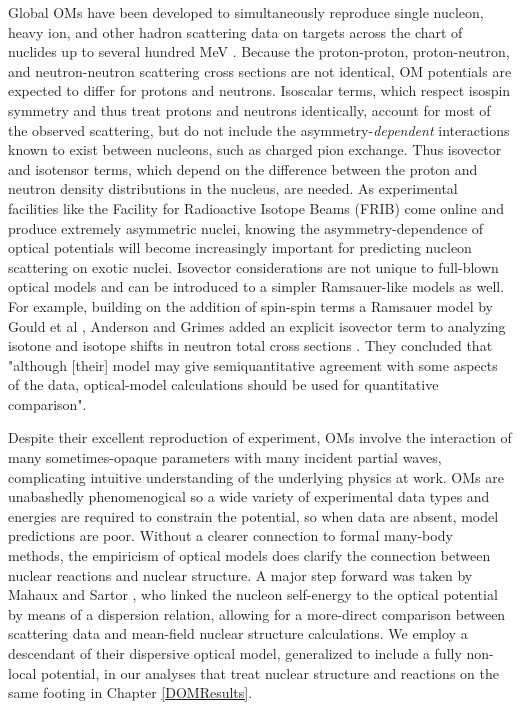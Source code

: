 Global OMs have been developed to simultaneously reproduce single nucleon, heavy ion,
and other hadron scattering data on targets across the chart of nuclides up to several
hundred MeV \cite{CH89, KoningDelaroche}. Because the proton-proton,
proton-neutron, and neutron-neutron scattering cross sections
are not identical, OM potentials are expected to differ for protons and
neutrons. Isoscalar terms, which respect isospin symmetry and thus treat protons and neutrons 
identically, account for most of the observed scattering, but do not include
the asymmetry-\textit{dependent} interactions known to exist between
nucleons, such as charged pion exchange.
Thus isovector and isotensor terms,
which depend on the difference between the proton and neutron density
distributions in the nucleus, are needed. As experimental facilities like
the Facility for Radioactive Isotope Beams (FRIB) come online and produce
extremely asymmetric nuclei, knowing the asymmetry-dependence of optical
potentials will become increasingly important for predicting nucleon scattering on
exotic nuclei. Isovector considerations are not unique to full-blown optical
models and can be introduced to a simpler Ramsauer-like models as well. For example, building
on the addition of spin-spin terms a Ramsauer model by Gould et al \cite{Gould1986},
Anderson and Grimes added an explicit isovector term to analyzing isotone and isotope shifts in 
neutron total cross sections \cite{Anderson1990}.
They concluded that "although [their] model may give
semiquantitative agreement with some aspects of the data, optical-model
calculations should be used for quantitative comparison".

Despite their excellent reproduction of experiment, OMs involve the interaction of
many sometimes-opaque parameters with many incident
partial waves, complicating intuitive understanding of the underlying physics at work.
OMs are unabashedly phenomenogical so a wide variety of
experimental data types and energies are required to constrain the potential,
so when data are absent, model predictions are poor. Without a clearer connection to formal
many-body methods, the empiricism of optical models does clarify the connection between nuclear
reactions and nuclear structure. A major step forward was taken by Mahaux and Sartor
\cite{Mahaux1991}, who linked the nucleon self-energy to the optical potential by means of a
dispersion relation, allowing for a more-direct comparison between scattering data and mean-field nuclear
structure calculations. We employ a descendant of their dispersive optical model, generalized to include a
fully non-local potential, in our analyses that treat nuclear structure and reactions on the same
footing in Chapter \ref{DOMResults}.

